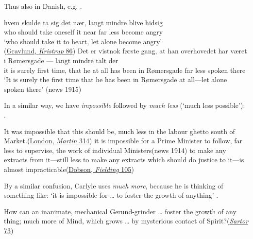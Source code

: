 Thus also in Danish, e.g. .

\ea \label{ex:04-253}
\ea
\gll hvem skulde ta sig det nær, langt mindre blive hidsig\\
 who should take oneself it near far less become angry\\
\glt `who should take it to heart, let alone become angry'\\
\hfill(\href{https://danskestudier.dk/wp-content/uploads/2018/06/1909.pdf}{Gravlund, \textit{Kristrup} 86}) %
\ex
\gll Det er vistnok første gang, at han overhovedet har været i Rømersgade {---} langt mindre talt der\\
 it is surely first time, that he {at all} has been in Rømersgade {} far less spoken there\\
\glt `It is surely the first time that he has been in Rømersgade at all---let alone spoken there'
\hfill(news 1915)
\z
\z

In a similar way, we have \textit{impossible} followed by \textit{much less} (`much less possible'): .\largerpage

\ea \label{ex:04-255}
\ea
It was impossible that this should be, much less in the labour ghetto south of Market.\hfill(\href{https://archive.org/details/in.ernet.dli.2015.65698/page/n265/mode/2up?q=\%22much+less+in+the+labour+ghetto+south+of+Market\%22&view=theater}{London, \textit{Martin} 314})
\ex
it is impossible for a Prime Minister to follow, far less to supervise, the work of individual Ministers\hfill(news 1914)
\ex
to make any extracts from it---still less to make any extracts which should do justice to it---is almost impracticable\hfill(\href{https://archive.org/details/henryfieldingeng0000aust/page/98/mode/2up?q=\%22make+any+extracts\%22&view=theater}{Dobson, \textit{Fielding} 105})
\z
\z

By a similar confusion, Carlyle uses \textit{much more}, because he is thinking of something like: `it is impossible for {\dots} to foster the growth of anything' .

\ea \label{ex:04-258}
How can an inanimate, mechanical Gerund-grinder {\dots} foster the growth of any thing; much more of Mind, which grows {\dots} by mysterious contact of Spirit?\hfill(\href{https://archive.org/details/sartorresartus02unkngoog/page/94/mode/2up?view=theater&q=\%22gerund-grinder%22}{\textit{Sartor} 73}) %
\z

